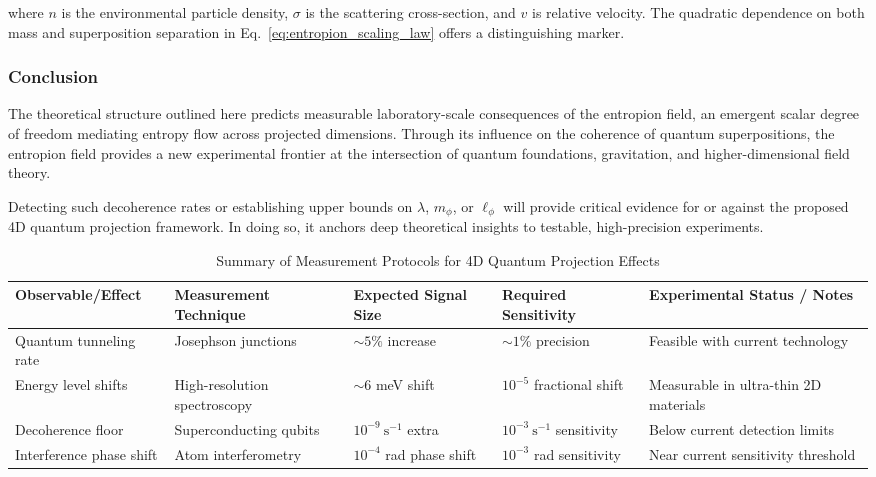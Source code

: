 \documentclass[12pt]{article}
\begin{document}
where $n$ is the environmental particle density, $\sigma$ is the scattering cross-section, and $v$ is relative velocity. The quadratic dependence on both mass and superposition separation in Eq.~\eqref{eq:entropion_scaling_law} offers a distinguishing marker.

\subsubsection*{Conclusion}

The theoretical structure outlined here predicts measurable laboratory-scale consequences of the entropion field, an emergent scalar degree of freedom mediating entropy flow across projected dimensions. Through its influence on the coherence of quantum superpositions, the entropion field provides a new experimental frontier at the intersection of quantum foundations, gravitation, and higher-dimensional field theory.

Detecting such decoherence rates or establishing upper bounds on $\lambda$, $m_\phi$, or $\ell_\phi$ will provide critical evidence for or against the proposed 4D quantum projection framework. In doing so, it anchors deep theoretical insights to testable, high-precision experiments.





\renewcommand{\arraystretch}{1.4} %

\begin{table}[ht]
\centering
\caption{Summary of Measurement Protocols for 4D Quantum Projection Effects}
\label{tab:measurement_protocols}
\begin{tabular}{|p{3cm}|p{2.8cm}|p{2.5cm}|p{2.5cm}|p{3.5cm}|}
\hline
\textbf{Observable/Effect} & \textbf{Measurement Technique} & \textbf{Expected Signal Size} & \textbf{Required Sensitivity} & \textbf{Experimental Status / Notes} \\ \hline
Quantum tunneling rate & Josephson junctions & $\sim 5\%$ increase & $\sim 1\%$ precision & Feasible with current technology \\ \hline
Energy level shifts & High-resolution spectroscopy & $\sim 6$ meV shift & $10^{-5}$ fractional shift & Measurable in ultra-thin 2D materials \\ \hline
Decoherence floor & Superconducting qubits & $10^{-9}\ \text{s}^{-1}$ extra & $10^{-3}\ \text{s}^{-1}$ sensitivity & Below current detection limits \\ \hline
Interference phase shift & Atom interferometry & $10^{-4}$ rad phase shift & $10^{-3}$ rad sensitivity & Near current sensitivity threshold \\ \hline
\end{tabular}
\end{table}
\end{document}
